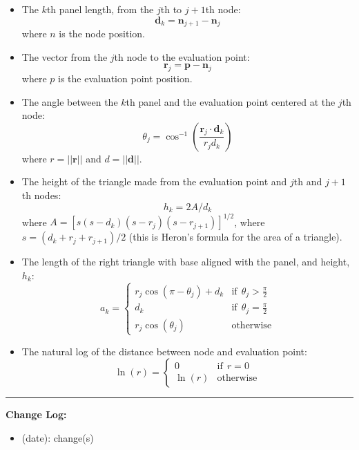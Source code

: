 \documentclass[]{article}
\newcommand{\vect}{\mathbf}
\begin{document}
\begin{itemize}
	\item The \(k\)th panel length, from the \(j\)th to \(j+1\)th node:
	\begin{equation}
		\vect{d}_k = \vect{n}_{j+1} - \vect{n}_j
	\end{equation}
	\noindent where \(n\) is the node position.
	\item The vector from the \(j\)th node to the evaluation point:
	\begin{equation}
		\vect{r}_j = \vect{p} - \vect{n}_j
	\end{equation}
	\noindent where \(p\) is the evaluation point position.
	\item The angle between the \(k\)th panel and the evaluation point centered at the \(j\)th node:
	\begin{equation}
		\theta_j = \cos^{-1}\left( \frac{\vect{r}_j \cdot \vect{d}_k}{r_jd_k} \right)
	\end{equation}
	\noindent where \(r = ||\vect{r}||\) and \(d = ||\vect{d}||\).
	\item The height of the triangle made from the evaluation point and \(j\)th and \(j+1\)th nodes:
	\begin{equation}
		h_k = 2A/d_k
	\end{equation}
	\noindent where \(A = \left[ s (s - d_k) (s - r_j) (s - r_{j+1}) \right]^{1/2} \), where \(s = (d_k + r_j + r_{j+1})/2\) (this is Heron's formula for the area of a triangle).
	\item The length of the right triangle with base aligned with the panel, and height, \(h_k\):
	\begin{equation}
		a_k = \begin{cases}
			r_j \cos(\pi - \theta_j) + d_k & \mathrm{if}~~ \theta_j > \frac{\pi}{2} \\
			d_k & \mathrm{if}~~ \theta_j = \frac{\pi}{2} \\
			r_j\cos(\theta_j) & \mathrm{otherwise} 
		\end{cases}
	\end{equation}
	\item The natural log of the distance between node and evaluation point:
	\begin{equation}
		\ln(r) = \begin{cases}
			0 & \mathrm{if}~~ r = 0 \\
			\ln(r) & \mathrm{otherwise}
		\end{cases}
	\end{equation}
\end{itemize}




















\newpage

{}


\vspace{1cm}
\hrule
\vspace{1cm}

\noindent  \textbf{Change Log:}

\begin{itemize}
	\item (date): change(s)
\end{itemize}
\end{document}
